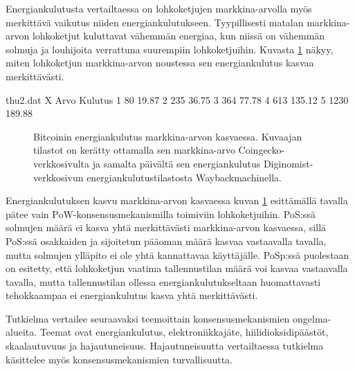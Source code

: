 \vspace{1cm}


Energiankulutusta vertailtaessa on lohkoketjujen markkina-arvolla myös merkittävä vaikutus niiden energiankulutukseen. Tyypillisesti matalan markkina-arvon lohkoketjut kuluttavat vähemmän energiaa, kun niissä on vähemmän solmuja ja louhijoita verrattuna suurempiin lohkoketjuihin. Kuvasta \ref{fig_energy} näkyy, miten lohkoketjun markkina-arvon noustessa sen energiankulutus kasvaa merkittävästi.

\begin{filecontents}{thu2.dat}
X Arvo  	Kulutus
1 80	    19.87 %
2 235	    36.75 %
3 364	    77.78 %
4 613	    135.12 %
5 1230  	189.88 %
\end{filecontents}

\begin{figure}[h!]
\centering
{}
\caption{Bitcoinin energiankulutus markkina-arvon kasvaessa. Kuvaajan tilastot on kerätty ottamalla sen markkina-arvo Coingecko-verkkosivulta ja samalta päivältä sen energiankulutus Diginomist-verkkosivun energiankulutustilastosta Waybackmachinella.}
\label{fig_energy}
\end{figure}

Energiankulutuksen kasvu markkina-arvon kasvaessa kuvan \ref{fig_energy} esittämällä tavalla pätee vain PoW-konsensusmekanismilla toimiviin lohkoketjuihin. PoS:ssä solmujen määrä ei kasva yhtä merkittävästi markkina-arvon kasvaessa, sillä PoS:ssä osakkaiden ja sijoitetun pääoman määrä kasvaa vastaavalla tavalla, mutta solmujen ylläpito ei ole yhtä kannattavaa käyttäjälle. PoSp:ssä puolestaan on esitetty, että lohkoketjun vaatima tallennustilan määrä voi kasvaa vastaavalla tavalla, mutta tallennustilan ollessa energiankulutukseltaan huomattavasti tehokkaampaa ei energiankulutus kasva yhtä merkittävästi.

Tutkielma vertailee seuraavaksi teemoittain konsensusmekanismien ongelma-alueita. Teemat ovat energiankulutus, elektroniikkajäte, hiilidioksidipäästöt, skaalautuvuus ja hajautuneisuus. Hajautuneisuutta vertailtaessa tutkielma käsittelee myös konsensusmekanismien turvallisuutta.





